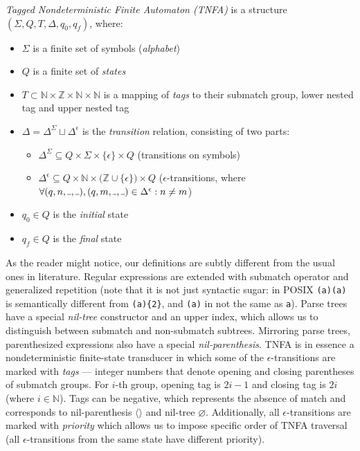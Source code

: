 \documentclass[AMA,STIX1COL]{WileyNJD-v2}
\newcommand{\Xm}{\langle\!\rangle}
\newcommand{\Xund}{\rule{.4em}{.4pt}}
\newcommand{\YN}{\mathbb{N}}
\newcommand{\YZ}{\mathbb{Z}}
\begin{document}
    \begin{definition}
    \emph{Tagged Nondeterministic Finite Automaton (TNFA)}
    is a structure $(\Sigma, Q, T, \Delta, q_0, q_f)$, where:
    \begin{itemize}
        \item[] $\Sigma$ is a finite set of symbols (\emph{alphabet})
        \item[] $Q$ is a finite set of \emph{states}
        \item[] $T \subset \YN \times \YZ \times \YN \times \YN$ is a mapping of \emph{tags} to their submatch group, lower nested tag and upper nested tag
        \item[] $\Delta = \Delta^\Sigma \sqcup \Delta^\epsilon$ is the \emph{transition} relation,
            consisting of two parts:
        \begin{itemize}
            \item[] $\Delta^\Sigma \subseteq Q \times \Sigma \times \{\epsilon\} \times Q$ (transitions on symbols)
            \item[] $\Delta^\epsilon \subseteq Q \times \YN \times \big( \YZ \cup \{\epsilon\} \big) \times Q$
                ($\epsilon$-transitions, where $\forall (q, n, \Xund, \Xund), (q, m, \Xund, \Xund) \in \Delta^\epsilon: n \neq m$)
        \end{itemize}
        \item[] $q_0 \in Q$ is the \emph{initial} state
        \item[] $q_f \in Q$ is the \emph{final} state
    \end{itemize}
    \end{definition}

As the reader might notice, our definitions are subtly different from the usual ones in literature.
Regular expressions are extended with submatch operator
and generalized repetition (note that it is not just syntactic sugar: in POSIX \texttt{(a)(a)} is semantically different from \texttt{(a)\{2\}},
and \texttt{(a)} in not the same as \texttt{a}).
Parse trees have a special \emph{nil-tree} constructor
and an upper index, which allows us to distinguish between submatch and non-submatch subtrees.
Mirroring parse trees, parenthesized expressions also have a special \emph{nil-parenthesis}.
TNFA is in essence a nondeterministic finite-state transducer
in which some of the $\epsilon$-transitions are marked with \emph{tags} ---
integer numbers that denote opening and closing parentheses of submatch groups.
For $i$-th group, opening tag is $2i - 1$ and closing tag is $2i$ (where $i \in \YN$).
Tags can be negative, which represents the absence of match and corresponds to nil-parenthesis $\Xm$ and nil-tree $\varnothing$.
Additionally, all $\epsilon$-transitions are marked with \emph{priority}
which allows us to impose specific order of TNFA traversal
(all $\epsilon$-transitions from the same state have different priority).
\\
\end{document}

